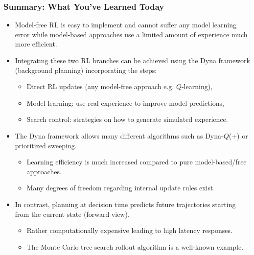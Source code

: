 \begin{frame}
\frametitle{Summary: What You've Learned Today}
\begin{itemize}
	\item Model-free RL is easy to implement and cannot suffer any model learning error while model-based approaches use a limited amount of experience much more efficient. \pause
	\item Integrating these two RL branches can be achieved using the Dyna framework (background planning) incorporating the steps:
	\begin{itemize}
		\item Direct RL updates (any model-free approach e.g. $Q$-learning),
		\item Model learning: use real experience to improve model predictions,
		\item Search control: strategies on how to generate simulated experience. \pause
	\end{itemize}
	\item The Dyna framework allows many different algorithms such as Dyna-$Q$(+) or prioritized sweeping.
	\begin{itemize}
		\item Learning efficiency is much increased compared to pure model-based/free approaches.
		\item Many degrees of freedom regarding internal update rules exist.\pause 
	\end{itemize}
	\item In contrast, planning at decision time predicts future trajectories starting from the current state (forward view).
	\begin{itemize}
		\item Rather computationally expensive leading to high latency responses.
		\item The Monte Carlo tree search rollout algorithm is a well-known example.
	\end{itemize}
\end{itemize}
\end{frame}

